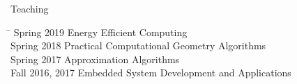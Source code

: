 
\begin{rSection}{Teaching}
\begin{tabbing}
\hspace{1.0in}\= \kill
    Spring 2019 \> Energy Efficient Computing \\
    Spring 2018 \> Practical Computational Geometry Algorithms \\
    Spring 2017 \> Approximation Algorithms \\
    Fall 2016, 2017 \>  Embedded System Development and Applications 
\end{tabbing}
\end{rSection}

